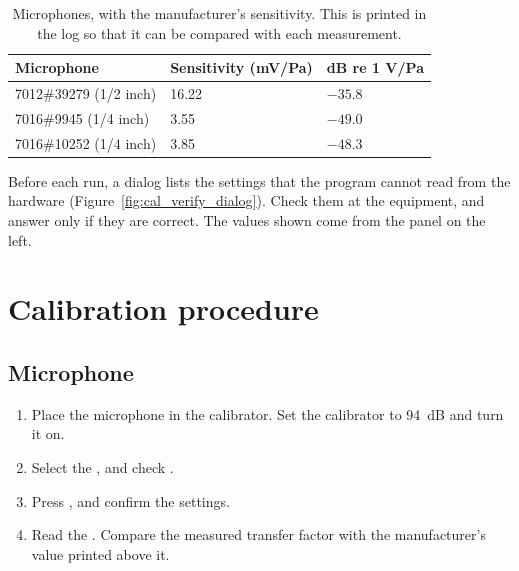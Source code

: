 \begin{table}[htbp]
\centering
\caption{Microphones, with the manufacturer's sensitivity. This is printed in the log so
that it can be compared with each measurement.}
\label{tab:microphones}
\begin{tabular}{@{}lll@{}}
\toprule
Microphone & Sensitivity (mV/Pa) & dB re 1 V/Pa \\
\midrule
7012\#39279 (1/2 inch) & 16.22 & $-35.8$ \\
7016\#9945 (1/4 inch) & 3.55 & $-49.0$ \\
7016\#10252 (1/4 inch) & 3.85 & $-48.3$ \\
\bottomrule
\end{tabular}
\end{table}

Before each run, a dialog lists the settings that the program cannot read from the
hardware (Figure~\ref{fig:cal_verify_dialog}). Check them at the equipment, and answer
 only if they are correct. The values shown come from the panel on the left.


\section{Calibration procedure}
\label{sec:cal-procedure}

\subsection{Microphone}


\begin{enumerate}
  \item Place the microphone in the calibrator. Set the calibrator to 94~dB and turn it
        on.
  \item Select the , and check .
  \item Press , and confirm the settings.
  \item Read the . Compare the measured transfer factor with the manufacturer's
        value printed above it.
\end{enumerate}

